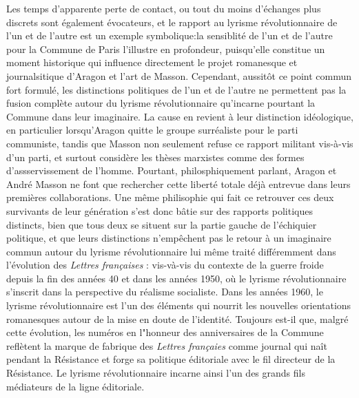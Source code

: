 Les temps d'apparente perte de contact, ou tout du moins d'échanges plus discrets sont également évocateurs, et le rapport au lyrisme révolutionnaire de l'un et de l'autre est un exemple symbolique:la sensiblité de l'un et de l'autre pour la Commune de Paris l'illustre en profondeur, puisqu'elle constitue un moment historique qui influence directement le projet romanesque et journalsitique d'Aragon et l'art de Masson. Cependant, aussitôt ce point commun fort formulé, les distinctions politiques de l'un et de l'autre ne permettent pas la fusion complète autour du lyrisme révolutionnaire qu'incarne pourtant la Commune dans leur imaginaire. La cause en revient à leur distinction idéologique, en particulier lorsqu'Aragon quitte le groupe surréaliste pour le parti communiste, tandis que Masson non seulement refuse ce rapport militant vis-à-vis d'un parti, et surtout considère les thèses marxistes comme des formes d'assservissement de l'homme. Pourtant, philosphiquement parlant, Aragon et André Masson ne font que rechercher cette liberté totale déjà entrevue dans leurs premières collaborations. Une même philisophie qui fait ce retrouver ces deux survivants de leur génération s'est donc bâtie sur des rapports politiques distincts, bien que tous deux se situent sur la partie gauche de l'échiquier politique, et que leurs distinctions n'empêchent pas le retour à un imaginaire commun autour du lyrisme révolutionnaire lui même traité différemment dans l'évolution des \emph{Lettres françaises} : vis-và-vis du contexte de la guerre froide depuis la fin des années 40 et dans les années 1950, où le lyrisme révolutionnaire s'inscrit dans la perspective du réalisme socialiste. Dans les années 1960, le lyrisme révolutionnaire est l'un des éléments qui nourrit les nouvelles orientations romanesques autour de la mise en doute de l'identité. Toujours est-il que, malgré cette évolution, les numéros en l"honneur des anniversaires de la Commune reflètent la marque de fabrique des \emph{Lettres françaies} comme journal qui naît pendant la Résistance et forge sa politique éditoriale avec le fil directeur de la Résistance. Le lyrisme révolutionnaire incarne ainsi l'un des grands fils médiateurs de la ligne éditoriale.

